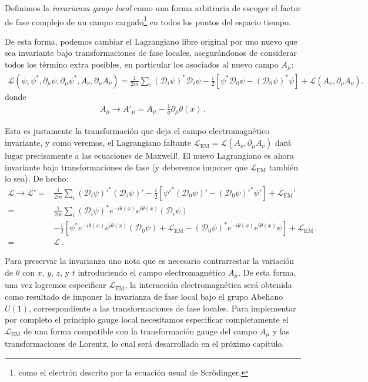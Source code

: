\begin{subappendices}
Definimos la \emph{invarianza gauge local} como una forma arbitraria de escoger el factor de fase complejo de un campo cargado\footnote{como el electrón descrito por la ecuación usual de  Scrödinger.} en todos los puntos del espacio tiempo.

\begin{frame}
De esta forma, podemos cambiar el Lagrangiano libre original por uno nuevo que sea invariante bajo transformaciones de fase locales, asegurándonos de considerar todos los término extra posibles, en particular los asociados al nuevo campo $A_{\mu}$:
\begin{align}
   \mathcal{L}(\psi,\psi^*,\partial_\mu\psi,\partial_\mu\psi^*,A_\nu,\partial_{\mu} A_{\nu} )
=\frac{1}{2m}\sum_i\left(\mathcal{D}_i\psi\right)^*\mathcal{D}_i\psi-\frac{i}{2}
  \left[\psi^*\mathcal{D}_0\psi-\left(\mathcal{D}_0\psi\right)^*\psi\right]+\mathcal{L}\left( A_{\nu},\partial_{\mu} A_{\nu} \right).
\end{align}
donde
\begin{align}
\label{eq:167qft}
  A_\mu\to A'_\mu=A_\mu-\frac{1}{q}\partial_\mu\theta(x)\,.
\end{align}
\end{frame}
Esta es justamente la transformación que deja el campo electromagnético invariante, y como veremos, el Lagrangiano faltante $\mathcal{L}_{\text{EM}}=\mathcal{L}\left( A_{\nu},\partial_{\mu} A_{\nu} \right)$ dará lugar precisamente a las ecuaciones de Maxwell!. El nuevo Lagrangiano es ahora invariante bajo transformaciones de fase (y deberemos imponer que $\mathcal{L}_{\text{EM}}$ también lo sea). De hecho:
\begin{align}
  \mathcal{L}\to \mathcal{L}'=&
\frac{1}{2m}\sum_i{\left(\mathcal{D}_i\psi\right)'}^*\left(\mathcal{D}_i\psi\right)'
-\frac{i}{2}\left[{\psi'}^*\left(\mathcal{D}_0\psi\right)'-{\left(\mathcal{D}_0\psi\right)'}^*\psi'\right]+\mathcal{L}_{\text{EM}}'\nonumber\\
=&
\frac{1}{2m}\sum_i{\left(\mathcal{D}_i\psi\right)}^*e^{-i\theta(x)}e^{i\theta(x)}\left(\mathcal{D}_i\psi\right)\nonumber\\
&-\frac{i}{2}\left[{\psi}^*e^{-i\theta(x)}e^{i\theta(x)}\left(\mathcal{D}_0\psi\right)+\mathcal{L}_{\text{EM}}
-{\left(\mathcal{D}_0\psi\right)}^*e^{-i\theta(x)}e^{i\theta(x)}\psi\right]+\mathcal{L}_{\text{EM}}\,.\nonumber\\
=&\mathcal{L}\,.
\end{align}

Para preservar la invarianza uno nota que es necesario contrarrestar la variación de  $\theta$ con $x$, $y$, $z$, y $t$ 
introduciendo el campo electromagnético  $A_\mu$. De esta forma, una vez logremos especificar $\mathcal{L}_{\text{EM}}$, la interacción electromagnética será obtenida como resultado de imponer la invarianza de fase local bajo el grupo Abeliano  $U(1)$, correspondiente a las transformaciones de fase locales. Para implementar por completo el principio gauge local necesitamos especificar completamente el $\mathcal{L}_{\text{EM}}$ de una forma compatible con la transformación gauge del campo $A_{\mu}$ y las transformaciones de Lorentz, lo cual será desarrollado en el próximo capítulo. 


\end{subappendices}
